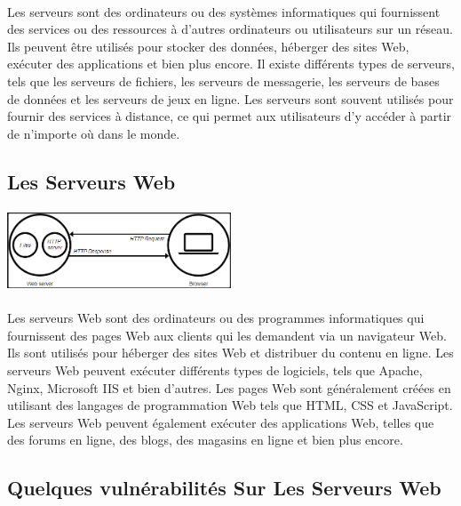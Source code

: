 \documentclass{report}
\begin{document}
  \paragraph{ }
  Les serveurs sont des ordinateurs ou des systèmes informatiques qui fournissent des services ou des ressources à d'autres ordinateurs ou utilisateurs sur un réseau. Ils peuvent être utilisés pour stocker des données, héberger des sites Web, exécuter des applications et bien plus encore. Il existe différents types de serveurs, tels que les serveurs de fichiers, les serveurs de messagerie, les serveurs de bases de données et les serveurs de jeux en ligne. Les serveurs sont souvent utilisés pour fournir des services à distance, ce qui permet aux utilisateurs d'y accéder à partir de n'importe où dans le monde.
  \pagebreak
  \subsection{Les Serveurs Web}
  \vspace{4mm}
  \paragraph{
  \includegraphics[width=0.5\textwidth]{Server_web.png}}
  \paragraph{ }
  Les serveurs Web sont des ordinateurs ou des programmes informatiques qui fournissent des pages Web aux clients qui les demandent via un navigateur Web. Ils sont utilisés pour héberger des sites Web et distribuer du contenu en ligne. Les serveurs Web peuvent exécuter différents types de logiciels, tels que Apache, Nginx, Microsoft IIS et bien d'autres. Les pages Web sont généralement créées en utilisant des langages de programmation Web tels que HTML, CSS et JavaScript. Les serveurs Web peuvent également exécuter des applications Web, telles que des forums en ligne, des blogs, des magasins en ligne et bien plus encore.
   
  \subsection{Quelques vulnérabilités Sur Les Serveurs Web }
\end{document}
